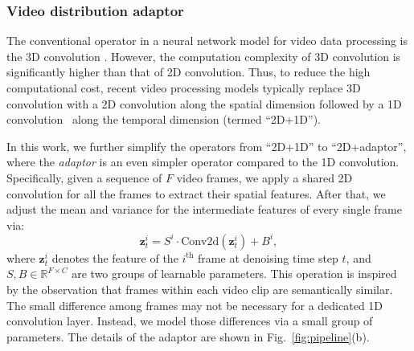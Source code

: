 \documentclass[10pt,twocolumn,letterpaper]{article}
\def\vz{{\bm{z}}}
\begin{document}
\subsubsection{Video distribution adaptor}
\label{subsubsec:adaptor}
The conventional operator in a neural network model for video data processing is the 3D convolution \cite{carreira2017quo}. However, the computation complexity   of 3D convolution is significantly higher than that of 2D convolution. Thus, to reduce the high computational cost, recent video processing models typically replace 3D convolution with a 2D convolution along the spatial dimension followed by a 1D convolution~\cite{tran2018closer} along the temporal dimension (termed ``2D+1D'').  


In this work, we further simplify the operators  from ``2D+1D'' to ``2D+adaptor'', where the \textit{adaptor} is an even simpler operator compared to the 1D convolution. Specifically, given a sequence of $F$ video frames, we apply a {shared} 2D convolution for all the frames to extract their spatial features. After that, we adjust the mean and variance for the intermediate features of every single frame via: 
\begin{equation}
    \vz^i_t = S^i \cdot \text{Conv2d}(\vz^i_t) + B^i,
\end{equation}
where $\vz^i_t$ denotes the feature of the $i^{\text{th}}$ frame at denoising time step $t$, and $S, B \in \mathbb{R}^{F \times C}$   are two groups of learnable parameters. This operation is inspired by the observation that frames within each video clip are semantically similar. The small difference among frames may not be necessary for a dedicated 1D convolution layer. Instead, we model those differences via a small group of parameters. The details    of the adaptor  are shown in Fig.~\ref{fig:pipeline}(b).
\end{document}
